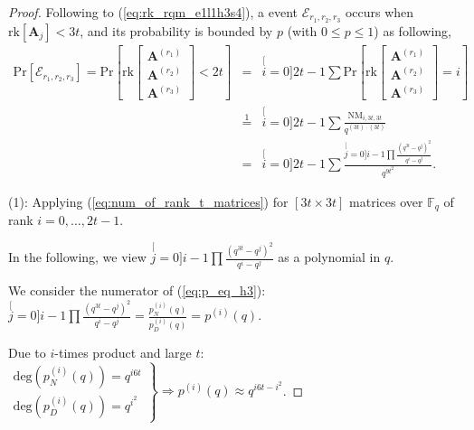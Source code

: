 \begin{proof}
Following to (\ref{eq:rk_rqm_e1l1h3s4}), a event $\mathcal{E}_{r_{1},r_{2},r_{3}}$
occurs when $\mathrm{rk}\left[\boldsymbol{A}_{j}\right]<3t$, and
its probability is bounded by $p$ (with $0\leq p\leq1$) as following,
\begin{eqnarray}
\mathrm{Pr}\left[\mathcal{E}_{r_{1},r_{2},r_{3}}\right]=\mathrm{Pr}\left[\mathrm{rk}\left[\begin{array}{c}
\boldsymbol{A}^{\left(r_{1}\right)}\\
\boldsymbol{A}^{\left(r_{2}\right)}\\
\boldsymbol{A}^{\left(r_{3}\right)}
\end{array}\right]<2t\right] & = & \stackrel[i=0]{2t-1}{\mathop{\sum}}\mathrm{Pr}\left[\mathrm{rk}\left[\begin{array}{c}
\boldsymbol{A}^{\left(r_{1}\right)}\\
\boldsymbol{A}^{\left(r_{2}\right)}\\
\boldsymbol{A}^{\left(r_{3}\right)}
\end{array}\right]=i\right]\label{eq:p_in_LLL}\\
 & \overset{1}{=} & \stackrel[i=0]{2t-1}{\mathop{\sum}}\frac{\mathrm{NM}_{i,3t,3t}}{q^{\left(3t\right)\cdot\left(3t\right)}}\nonumber \\
 & = & \stackrel[i=0]{2t-1}{\mathop{\sum}}\frac{\stackrel[j=0]{i-1}{\mathop{\prod}}\frac{\left(q^{3t}-q^{j}\right)^{2}}{q^{i}-q^{j}}}{q^{9t^{2}}}.\label{eq:p_eq_h3}
\end{eqnarray}

(1): Applying (\ref{eq:num_of_rank_t_matrices}) for $\left[3t\times3t\right]$
matrices over $\ensuremath{\mathbb{F}}_{q}$ of rank $i=0,\ldots,2t-1$.

In the following, we view $\stackrel[j=0]{i-1}{\mathop{\prod}}\frac{\left(q^{3t}-q^{j}\right)^{2}}{q^{i}-q^{j}}$
as a polynomial in $q$.

We consider the numerator of (\ref{eq:p_eq_h3}): $\stackrel[j=0]{i-1}{\mathop{\prod}}\frac{\left(q^{3t}-q^{j}\right)^{2}}{q^{i}-q^{j}}=\frac{p_{N}^{(i)}(q)}{p_{D}^{(i)}(q)}=p^{(i)}(q)$.

Due to $i$-times product and large $t$: $\left.\begin{array}{c}
\mathrm{deg}\left(p_{N}^{(i)}(q)\right)=q^{i6t}\\
\mathrm{deg}\left(p_{D}^{(i)}(q)\right)=q^{i^{2}}
\end{array}\right\} \Rightarrow p^{(i)}(q)\approx q^{i6t-i^{2}}$.


\end{proof}
